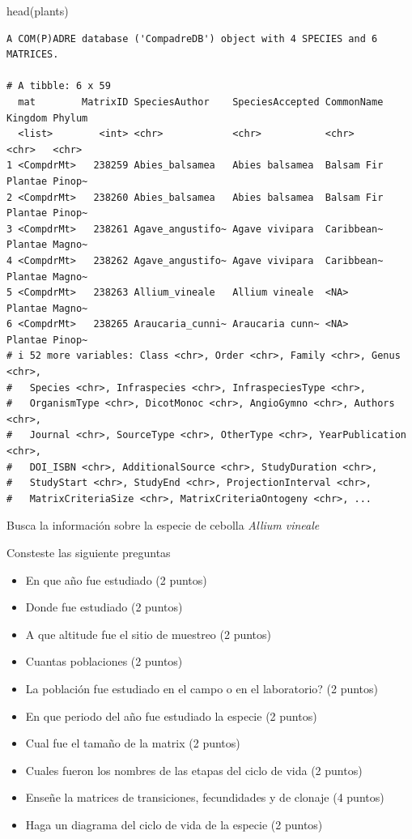 \documentclass[
  12pt,
  letterpaper,
]{book}
\newenvironment{Shaded}{\begin{snugshade}}{\end{snugshade}}
\newcommand{\FunctionTok}[1]{\textcolor[rgb]{0.28,0.35,0.67}{#1}}
\newcommand{\NormalTok}[1]{\textcolor[rgb]{0.00,0.23,0.31}{#1}}
\begin{document}
\begin{Shaded}
\begin{Highlighting}[]
\FunctionTok{head}\NormalTok{(plants)}
\end{Highlighting}
\end{Shaded}

\begin{verbatim}
A COM(P)ADRE database ('CompadreDB') object with 4 SPECIES and 6 MATRICES.

# A tibble: 6 x 59
  mat        MatrixID SpeciesAuthor    SpeciesAccepted CommonName Kingdom Phylum
  <list>        <int> <chr>            <chr>           <chr>      <chr>   <chr> 
1 <CompdrMt>   238259 Abies_balsamea   Abies balsamea  Balsam Fir Plantae Pinop~
2 <CompdrMt>   238260 Abies_balsamea   Abies balsamea  Balsam Fir Plantae Pinop~
3 <CompdrMt>   238261 Agave_angustifo~ Agave vivipara  Caribbean~ Plantae Magno~
4 <CompdrMt>   238262 Agave_angustifo~ Agave vivipara  Caribbean~ Plantae Magno~
5 <CompdrMt>   238263 Allium_vineale   Allium vineale  <NA>       Plantae Magno~
6 <CompdrMt>   238265 Araucaria_cunni~ Araucaria cunn~ <NA>       Plantae Pinop~
# i 52 more variables: Class <chr>, Order <chr>, Family <chr>, Genus <chr>,
#   Species <chr>, Infraspecies <chr>, InfraspeciesType <chr>,
#   OrganismType <chr>, DicotMonoc <chr>, AngioGymno <chr>, Authors <chr>,
#   Journal <chr>, SourceType <chr>, OtherType <chr>, YearPublication <chr>,
#   DOI_ISBN <chr>, AdditionalSource <chr>, StudyDuration <chr>,
#   StudyStart <chr>, StudyEnd <chr>, ProjectionInterval <chr>,
#   MatrixCriteriaSize <chr>, MatrixCriteriaOntogeny <chr>, ...
\end{verbatim}

Busca la información sobre la especie de cebolla \emph{Allium vineale}

Consteste las siguiente preguntas

\begin{itemize}
\item
  En que año fue estudiado (2 puntos)
\item
  Donde fue estudiado (2 puntos)
\item
  A que altitude fue el sitio de muestreo (2 puntos)
\item
  Cuantas poblaciones (2 puntos)
\item
  La población fue estudiado en el campo o en el laboratorio? (2 puntos)
\item
  En que periodo del año fue estudiado la especie (2 puntos)
\item
  Cual fue el tamaño de la matrix (2 puntos)
\item
  Cuales fueron los nombres de las etapas del ciclo de vida (2 puntos)
\item
  Enseñe la matrices de transiciones, fecundidades y de clonaje (4
  puntos)
\item
  Haga un diagrama del ciclo de vida de la especie (2 puntos)
\end{itemize}


\backmatter
\end{document}

